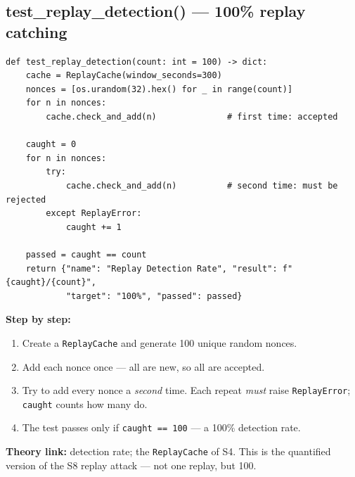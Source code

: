 \documentclass[11pt,a4paper]{article}
\begin{document}
\subsection{test\_replay\_detection() --- 100\% replay catching}
\begin{lstlisting}[style=py,caption={evaluate\_security.py --- the replay detection test.}]
def test_replay_detection(count: int = 100) -> dict:
    cache = ReplayCache(window_seconds=300)
    nonces = [os.urandom(32).hex() for _ in range(count)]
    for n in nonces:
        cache.check_and_add(n)              # first time: accepted

    caught = 0
    for n in nonces:
        try:
            cache.check_and_add(n)          # second time: must be rejected
        except ReplayError:
            caught += 1

    passed = caught == count
    return {"name": "Replay Detection Rate", "result": f"{caught}/{count}",
            "target": "100%", "passed": passed}
\end{lstlisting}
\textbf{Step by step:}
\begin{enumerate}
  \item Create a \texttt{ReplayCache} and generate 100 unique random nonces.
  \item Add each nonce once --- all are new, so all are accepted.
  \item Try to add every nonce a \emph{second} time. Each repeat \emph{must}
        raise \texttt{ReplayError}; \texttt{caught} counts how many do.
  \item The test passes only if \texttt{caught == 100} --- a 100\% detection rate.
\end{enumerate}
\textbf{Theory link:} detection rate; the \texttt{ReplayCache} of S4. This is the
quantified version of the S8 replay attack --- not one replay, but 100.
\end{document}
